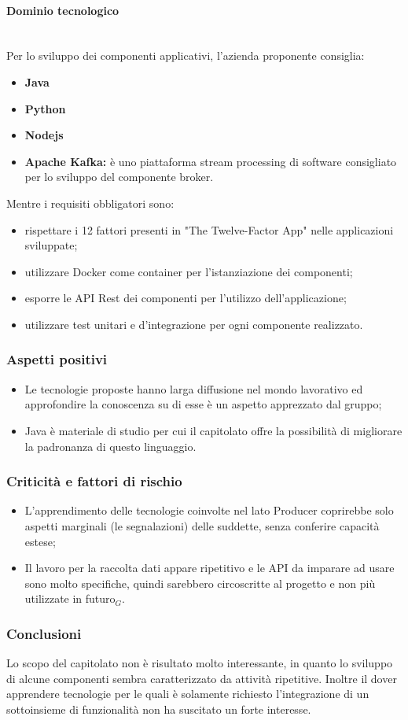\paragraph{Dominio tecnologico}\mbox{}\\
Per lo sviluppo dei componenti applicativi, l'azienda proponente consiglia:
\begin{itemize}
	\item \textbf{Java}
	\item \textbf{Python}
	\item \textbf{Nodejs}
	\item \textbf{Apache Kafka:} è uno piattaforma stream processing di software consigliato per lo sviluppo del componente broker.
\end{itemize}
Mentre i requisiti obbligatori sono:
\begin{itemize}
	\item rispettare i 12 fattori presenti in "The Twelve-Factor App" nelle applicazioni sviluppate;
	\item utilizzare Docker come container per l'istanziazione dei componenti;
	\item esporre le API Rest dei componenti per l'utilizzo dell'applicazione; 
	\item utilizzare test unitari e d'integrazione per ogni componente realizzato.
\end{itemize}
\subsubsection{Aspetti positivi}
\begin{itemize}
	\item Le tecnologie proposte hanno larga diffusione nel mondo lavorativo ed approfondire la conoscenza su di esse è un aspetto apprezzato dal gruppo;
	\item Java è materiale di studio per cui il capitolato offre la possibilità di migliorare la padronanza di questo linguaggio.
\end{itemize}
\subsubsection{Criticità e fattori di rischio}
\begin{itemize}
	\item L'apprendimento delle tecnologie coinvolte nel lato Producer coprirebbe solo aspetti marginali (le segnalazioni) delle suddette, senza conferire capacità estese;
	\item Il lavoro per la raccolta dati appare ripetitivo e le API da imparare ad usare sono molto specifiche, quindi sarebbero circoscritte al progetto e non più utilizzate in futuro$_{G}$. 
	
\end{itemize}
\subsubsection{Conclusioni}
Lo scopo del capitolato non è risultato molto interessante, in quanto lo sviluppo di alcune componenti sembra caratterizzato da attività ripetitive. Inoltre il dover apprendere tecnologie per le quali è solamente richiesto l'integrazione di un sottoinsieme di funzionalità non ha suscitato un forte interesse.
